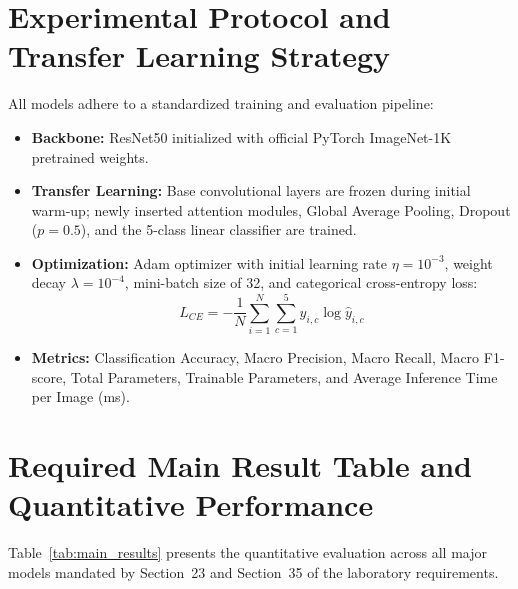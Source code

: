 \documentclass[11pt,a4paper]{article}
\begin{document}
\section{Experimental Protocol and Transfer Learning Strategy}
All models adhere to a standardized training and evaluation pipeline:
\begin{itemize}[noitemsep,topsep=0pt]
    \item \textbf{Backbone:} ResNet50 initialized with official PyTorch ImageNet-1K pretrained weights.
    \item \textbf{Transfer Learning:} Base convolutional layers are frozen during initial warm-up; newly inserted attention modules, Global Average Pooling, Dropout ($p=0.5$), and the 5-class linear classifier are trained.
    \item \textbf{Optimization:} Adam optimizer with initial learning rate $\eta = 10^{-3}$, weight decay $\lambda = 10^{-4}$, mini-batch size of 32, and categorical cross-entropy loss:
    \begin{equation}
    L_{CE} = -\frac{1}{N} \sum_{i=1}^N \sum_{c=1}^5 y_{i,c} \log \hat{y}_{i,c}
    \end{equation}
    \item \textbf{Metrics:} Classification Accuracy, Macro Precision, Macro Recall, Macro F1-score, Total Parameters, Trainable Parameters, and Average Inference Time per Image (ms).
\end{itemize}

\section{Required Main Result Table and Quantitative Performance}
Table~\ref{tab:main_results} presents the quantitative evaluation across all major models mandated by Section~23 and Section~35 of the laboratory requirements.
\end{document}
